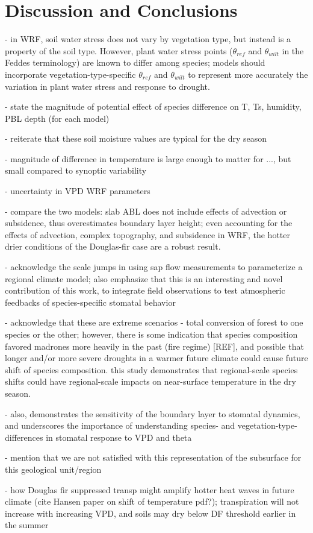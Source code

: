 \section{Discussion and Conclusions}

- in WRF, soil water stress does not vary by vegetation type, but instead is a property of the soil type.  However, plant water stress points ($\theta_{ref}$ and $\theta_{wilt}$ in the Feddes terminology) are known to differ among species; models should incorporate vegetation-type-specific $\theta_{ref}$ and $\theta_{wilt}$  to represent more accurately the variation in plant water stress and response to drought.

- state the magnitude of potential effect of species difference on T, Ts, humidity, PBL depth (for each model)

- reiterate that these soil moisture values are typical for the dry season

- magnitude of difference in temperature is large enough to matter for ..., but small compared to synoptic variability

- uncertainty in VPD WRF parameters

- compare the two models: slab ABL does not include effects of advection or subsidence, thus overestimates boundary layer height; even accounting for the effects of advection, complex topography, and subsidence in WRF, the hotter drier conditions of the Douglas-fir case are a robust result.

- acknowledge the scale jumps in using sap flow measurements to parameterize a regional climate model; also emphasize that this is an interesting and novel contribution of this work, to integrate field observations to test atmospheric feedbacks of species-specific stomatal behavior

- acknowledge that these are extreme scenarios - total conversion of forest to one species or the other; however, there is some indication that species composition favored madrones more heavily in the past (fire regime) [REF], and possible that longer and/or more severe droughts in a warmer future climate could cause future shift of species composition.  this study demonstrates that regional-scale species shifts could have regional-scale impacts on near-surface temperature in the dry season.

- also, demonstrates the sensitivity of the boundary layer to stomatal dynamics, and underscores the importance of understanding species- and vegetation-type-differences in stomatal response to VPD and theta

- mention that we are not satisfied with this representation of the subsurface for this geological unit/region

- how Douglas fir suppressed transp might amplify hotter heat waves in future climate (cite Hansen paper on shift of temperature pdf?); transpiration will not increase with increasing VPD, and soils may dry below DF threshold earlier in the summer
